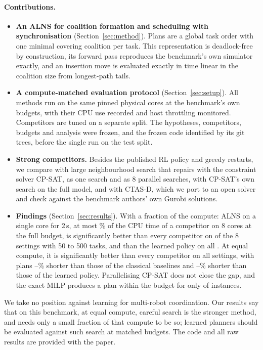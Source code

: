 \paragraph{Contributions.}
\begin{itemize}
\item \textbf{An ALNS for coalition formation and scheduling with synchronisation} (Section~\ref{sec:method}). Plans
  are a global task order with one minimal covering coalition per task. This representation is deadlock-free by
  construction, its forward pass reproduces the benchmark's own simulator exactly, and an insertion move is
  evaluated exactly in time linear in the coalition size from longest-path tails.
\item \textbf{A compute-matched evaluation protocol} (Section~\ref{sec:setup}). All methods run on the same
  pinned physical cores at the benchmark's own budgets, with their CPU use recorded and host throttling monitored.
  Competitors are tuned on a separate split. The hypotheses, competitors, budgets and analysis were frozen, and the
  frozen code identified by its git trees, before the single run on the test split.
\item \textbf{Strong competitors.} Besides the published RL policy and greedy restarts, we compare with large
  neighbourhood search that repairs with the constraint solver CP-SAT, as one search and as 8 parallel searches, with
  CP-SAT's own search on the full model, and with
  CTAS-D, which we port to an open solver and check against the benchmark authors' own Gurobi solutions.
\item \textbf{Findings} (Section~\ref{sec:results}). With a fraction of the compute: ALNS on a single core for
  2\,s, at most \ShareTwohi\% of the CPU time of a competitor on 8 cores at the full budget, is significantly
  better than every competitor on \Ctwoheld{} of the 8 settings with 50 to 500 tasks, and than the learned policy
  on all \CtwoRLheld{}. At equal compute, it is significantly better than every competitor on all
  \ConeBheld{} settings, with plans \ConeBclasslo--\ConeBclasshi\% shorter than those of the classical baselines
  and \ConeBrlgainlo--\ConeBrlgainhi\% shorter than those of the learned policy. Parallelising CP-SAT does not close
  the gap, and the exact MILP produces a plan within the budget for only \CtasSolved{} of \CtasRuns{} instances.
\end{itemize}

We take no position against learning for multi-robot coordination. Our results say that on this benchmark, at equal
compute, careful search is the stronger method, and needs only a small fraction of that compute to be so; learned
planners should be evaluated against such search
at matched budgets. The code and all raw results are provided with the paper.
